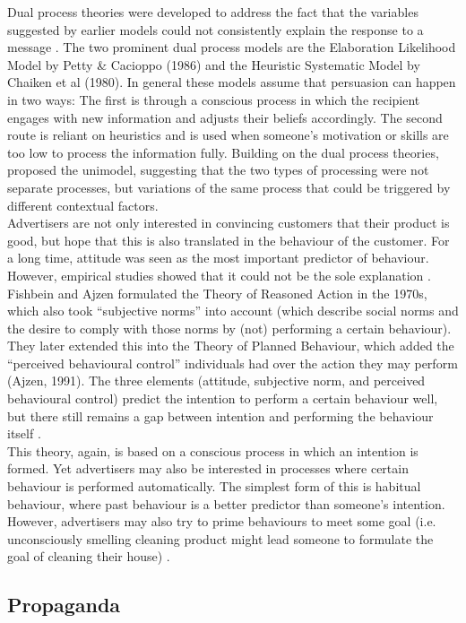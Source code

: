 Dual process theories were developed to address the fact that the variables suggested by earlier models could not consistently explain the response to a message \cite{Xu2017}. The two prominent dual process models are the Elaboration Likelihood Model by Petty \& Cacioppo (1986) and the Heuristic Systematic Model by Chaiken et al (1980). In general these models assume that persuasion can happen in two ways: The first is through a conscious process in which the recipient engages with new information and adjusts their beliefs accordingly. The second route is reliant on heuristics and is used when someone’s motivation or skills are too low to process the information fully. Building on the dual process theories, \cite{Kruglanski1999} proposed the unimodel, suggesting that the two types of processing were not separate  processes, but variations of the same process that could be triggered by different contextual factors. \\

Advertisers are not only interested in convincing customers that their product is good, but hope that this is also translated in the behaviour of the customer. For a long time, attitude was seen as the most important predictor of behaviour. However, empirical studies showed that it could not be the sole explanation \citep{Fennis2015}. Fishbein and Ajzen formulated the Theory of Reasoned Action in the 1970s, which also took “subjective norms” into account (which describe social norms and the desire to comply with those norms by (not) performing a certain behaviour). They later extended this into the Theory of Planned Behaviour, which added the “perceived behavioural control” individuals had over the action they may perform (Ajzen, 1991). The three elements (attitude, subjective norm, and perceived behavioural control) predict the intention to perform a certain behaviour well, but there still remains a gap between intention and performing the behaviour itself \citep{Fennis2015}. \\

This theory, again, is based on a conscious process in which an intention is formed. Yet advertisers may also be interested in processes where certain behaviour is performed automatically.  The simplest form of this is habitual behaviour, where past behaviour is a better predictor than someone’s intention. However, advertisers may also try to prime behaviours to meet some goal (i.e. unconsciously smelling cleaning product might lead someone to formulate the goal of cleaning their house) \citep{Fennis2015}.  


\subsection{Propaganda} 



